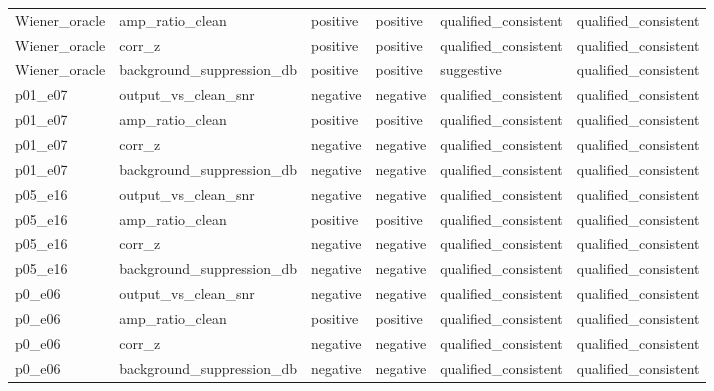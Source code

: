 \begin{tabular}{llllll}
Wiener\_oracle & amp\_ratio\_clean & positive & positive & qualified\_consistent & qualified\_consistent \\
Wiener\_oracle & corr\_z & positive & positive & qualified\_consistent & qualified\_consistent \\
Wiener\_oracle & background\_suppression\_db & positive & positive & suggestive & qualified\_consistent \\
p01\_e07 & output\_vs\_clean\_snr & negative & negative & qualified\_consistent & qualified\_consistent \\
p01\_e07 & amp\_ratio\_clean & positive & positive & qualified\_consistent & qualified\_consistent \\
p01\_e07 & corr\_z & negative & negative & qualified\_consistent & qualified\_consistent \\
p01\_e07 & background\_suppression\_db & negative & negative & qualified\_consistent & qualified\_consistent \\
p05\_e16 & output\_vs\_clean\_snr & negative & negative & qualified\_consistent & qualified\_consistent \\
p05\_e16 & amp\_ratio\_clean & positive & positive & qualified\_consistent & qualified\_consistent \\
p05\_e16 & corr\_z & negative & negative & qualified\_consistent & qualified\_consistent \\
p05\_e16 & background\_suppression\_db & negative & negative & qualified\_consistent & qualified\_consistent \\
p0\_e06 & output\_vs\_clean\_snr & negative & negative & qualified\_consistent & qualified\_consistent \\
p0\_e06 & amp\_ratio\_clean & positive & positive & qualified\_consistent & qualified\_consistent \\
p0\_e06 & corr\_z & negative & negative & qualified\_consistent & qualified\_consistent \\
p0\_e06 & background\_suppression\_db & negative & negative & qualified\_consistent & qualified\_consistent \\
\bottomrule
\end{tabular}
